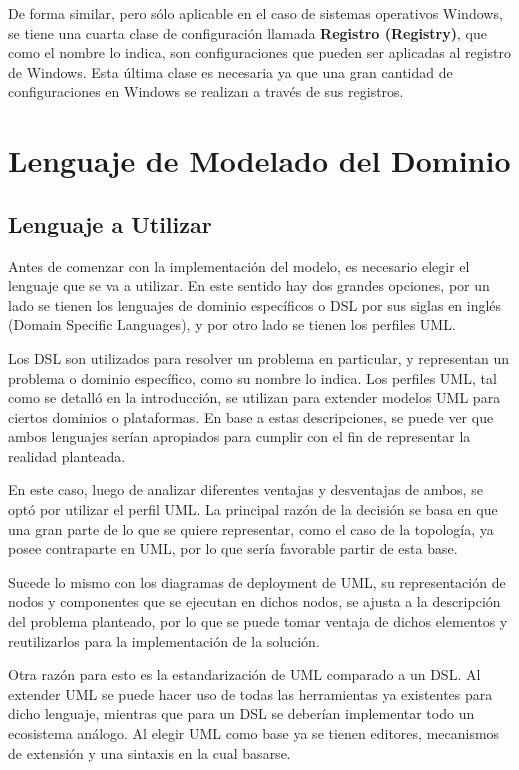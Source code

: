 De forma similar, pero sólo aplicable en el caso de sistemas operativos Windows, se tiene una cuarta clase de configuración llamada \textbf{Registro (Registry)}, que como el nombre lo indica, son configuraciones que pueden ser aplicadas al registro de Windows. Esta última clase es necesaria ya que una gran cantidad de configuraciones en Windows se realizan a través de sus registros.

\section{Lenguaje de Modelado del Dominio}

\subsection{Lenguaje a Utilizar}
Antes de comenzar con la implementación del modelo, es necesario elegir el lenguaje que se va a utilizar. En este sentido hay dos grandes opciones, por un lado se tienen los lenguajes de dominio específicos o DSL por sus siglas en inglés (Domain Specific Languages), y por otro lado se tienen los perfiles UML. 

Los DSL son utilizados para resolver un problema en particular, y representan un problema o dominio específico, como su nombre lo indica.
Los perfiles UML, tal como se detalló en la introducción, se utilizan para extender modelos UML para ciertos dominios o plataformas.
En base a estas descripciones, se puede ver que ambos lenguajes serían apropiados para cumplir con el fin de representar la realidad planteada. 

En este caso, luego de analizar diferentes ventajas y desventajas de ambos, se optó por utilizar el perfil UML. La principal razón de la decisión se basa en que una gran parte de lo que se quiere representar, como el caso de la topología, ya posee contraparte en UML, por lo que sería favorable partir de esta base. 

Sucede lo mismo con los diagramas de deployment de UML, su representación de nodos y componentes que se ejecutan en dichos nodos, se ajusta a la descripción del problema planteado, por lo que se puede tomar ventaja de dichos elementos y reutilizarlos para la implementación de la solución.

Otra razón para esto es la estandarización de UML comparado a un DSL. Al extender UML se puede hacer uso de todas las herramientas ya existentes para dicho lenguaje, mientras que para un DSL se deberían implementar todo un ecosistema análogo. Al elegir UML como base ya se tienen editores, mecanismos de extensión y una sintaxis en la cual basarse.

